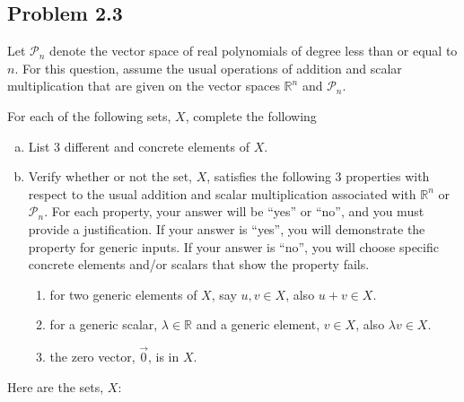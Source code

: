 \subsection*{Problem 2.3}
Let $\mathcal{P}_n$ denote the vector space of real polynomials of degree less than or equal to $n$. For this question, assume the usual operations of addition and scalar multiplication that are given on the vector spaces $\mathbb{R}^n$ and $\mathcal{P}_n$.
	
	For each of the following sets, $X$, complete the following
	\begin{enumerate}[(a)]
		
		\item List 3 different and concrete elements of $X$.
		\item Verify whether or not the set, $X$, satisfies the following 3 properties with respect to the usual addition and scalar multiplication associated with $\mathbb{R}^n$ or $\mathcal{P}_n$.  For each property, your answer will be ``yes'' or ``no'', and you must provide a justification.  If your answer is ``yes'', you will demonstrate the property for generic inputs.  If your answer is ``no'', you will choose specific concrete elements and/or scalars that show the property fails.
		\begin{enumerate}[(1)]
			\item for two generic elements of $X$, say $u,v\in X$, also $u+v\in X$.
			\item for a generic scalar, $\lambda\in\mathbb{R}$ and a generic element, $v\in X$, also $\lambda v\in X$.
			\item the zero vector, $\vec{0}$, is in $X$.
		\end{enumerate}
    \end{enumerate}
    Here are the sets, $X$:

